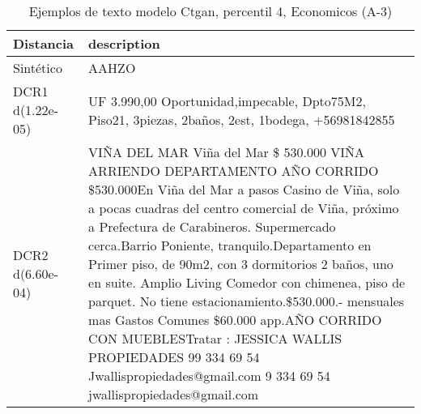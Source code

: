 \begin{table}[H]
\centering
\fontsize{10}{14}\selectfont
\caption{Ejemplos de texto modelo Ctgan, percentil 4, Economicos (A-3)}
\label{table-example-economicos-a-3-ctgan-4p-text}
\begin{tabular}{|l|m{35em}|}
\hline
\rowcolor[gray]{0.8}
Distancia & description \\
\hline Sintético & AAHZO \\
\hline DCR1 d(1.22e-05) & UF 3.990,00 Oportunidad,impecable, Dpto75M2, Piso21, 3piezas, 2ba\~nos, 2est, 1bodega,  +56981842855 \\
\hline DCR2 d(6.60e-04) & VI\~NA DEL MAR Vi\~na del Mar \$ 530.000 VI\~NA ARRIENDO DEPARTAMENTO A\~NO CORRIDO \$530.000En Vi\~na del Mar a pasos Casino de Vi\~na, solo a pocas cuadras del centro comercial de Vi\~na, pr\'oximo a Prefectura de Carabineros. Supermercado cerca.Barrio Poniente, tranquilo.Departamento en Primer piso, de 90m2, con 3 dormitorios 2 ba\~nos, uno en suite.  Amplio Living Comedor con chimenea, piso de parquet. No tiene estacionamiento.\$530.000.- mensuales mas Gastos Comunes \$60.000 app.A\~NO CORRIDO CON MUEBLESTratar : JESSICA WALLIS PROPIEDADES         99 334 69 54         Jwallispropiedades@gmail.com 9 334 69 54 jwallispropiedades@gmail.com \\
\hline
\end{tabular}
\end{table}
